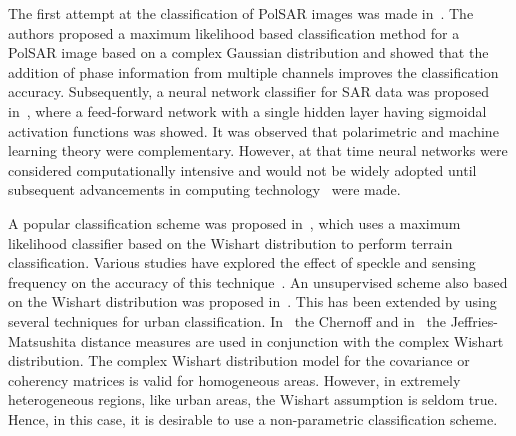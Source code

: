 The first attempt at the classification of PolSAR images was made in~\cite{kong1988identification}. The authors proposed a maximum likelihood based classification method for a PolSAR image based on a complex Gaussian distribution and showed that the addition of phase information from multiple channels improves the classification accuracy. Subsequently, a neural network classifier for SAR data was proposed in~\cite{pottier1991radar}, where a feed-forward network with a single hidden layer having sigmoidal activation functions was showed. It was observed that polarimetric and machine learning theory were complementary. However, at that time neural networks were considered computationally intensive and would not be widely adopted until subsequent advancements in computing technology~\cite{anderson1995introduction} were made.

A popular classification scheme was proposed in~\cite{lee1994classification}, which uses a maximum likelihood classifier based on the Wishart distribution to perform terrain classification. Various studies have explored the effect of speckle and sensing frequency on the accuracy of this technique~\cite{lee2001quantitative}. An unsupervised scheme also based on the Wishart distribution was proposed in~\cite{lee2004unsupervised}. This has been extended by using several techniques for urban classification. In~\cite{dabboor2013unsupervised} the Chernoff  and in~\cite{dabboor2014jeffries} the Jeffries-Matsushita distance measures are used in conjunction with the complex Wishart distribution. 
The complex Wishart distribution model for the covariance or coherency matrices is valid for homogeneous areas. %
However, in extremely heterogeneous regions, like urban areas, the Wishart assumption    is seldom true. Hence, in this case, it is desirable to use a non-parametric classification scheme. 


